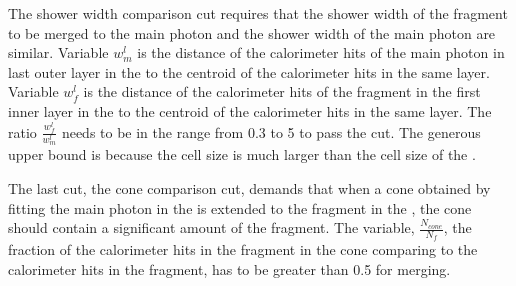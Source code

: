 The shower width comparison cut requires that the shower width of the fragment to be merged to the main photon  and the shower width of the main photon are similar. Variable $w^l_m$ is the \rms distance of the calorimeter hits of the main photon in last outer layer  in the \ECAL to the centroid of the calorimeter hits in the same layer. Variable  $w^l_f$ is the  \rms distance of the calorimeter hits of the fragment in the first inner layer  in the \HCAL to the centroid of the calorimeter hits in the same layer. The ratio $\frac{w^l_f}{w^l_m}$ needs to be in the range from 0.3 to 5 to pass the cut. The generous upper bound is because the \HCAL cell size is much larger than the cell size of the \ECAL.


The last cut, the cone comparison cut, demands that when a cone obtained by fitting the main photon in the \ECAL is extended to the fragment in the \HCAL, the cone should contain a significant amount of the fragment. The variable, $\frac{N_{cone}}{N_f}$, the fraction of the calorimeter hits in the fragment in the cone comparing to the  calorimeter hits in the fragment, has to be greater than 0.5 for merging.



